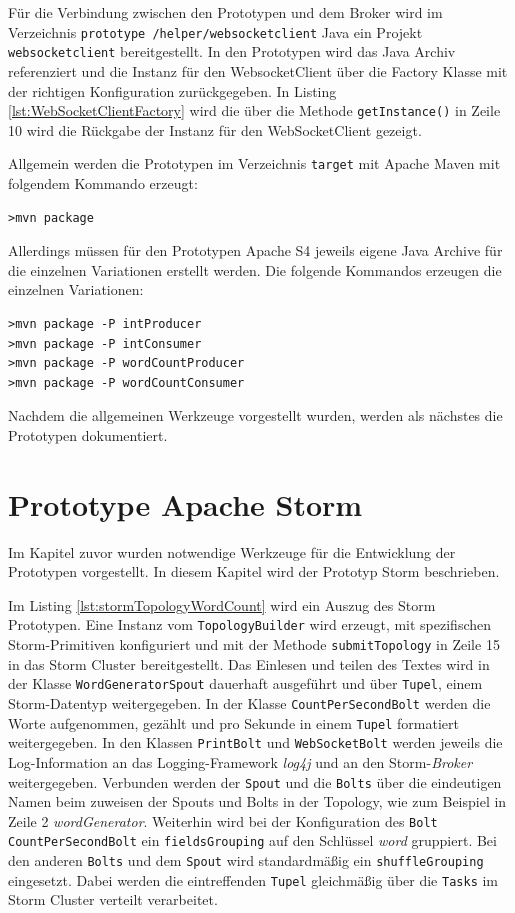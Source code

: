 Für die Verbindung zwischen den Prototypen und dem Broker wird im Verzeichnis \texttt{prototype /helper/websocketclient} Java ein Projekt \texttt{websocketclient} bereitgestellt. In den Prototypen wird das Java Archiv referenziert und 
die Instanz für den WebsocketClient über die Factory Klasse mit der richtigen Konfiguration zurückgegeben. In Listing \ref{lst:WebSocketClientFactory} wird die über die Methode \texttt{getInstance()} in Zeile 10 wird die Rückgabe der Instanz für den WebSocketClient gezeigt.

Allgemein werden die Prototypen im Verzeichnis \texttt{target} mit Apache Maven mit folgendem Kommando erzeugt:
\begin{verbatim}
>mvn package
\end{verbatim}

Allerdings müssen für den Prototypen Apache S4 jeweils eigene Java Archive für die einzelnen Variationen erstellt werden. Die folgende Kommandos erzeugen die einzelnen Variationen:
\begin{verbatim}
>mvn package -P intProducer
>mvn package -P intConsumer
>mvn package -P wordCountProducer
>mvn package -P wordCountConsumer
\end{verbatim}

Nachdem die allgemeinen Werkzeuge vorgestellt wurden, werden als nächstes die Prototypen dokumentiert.


\section{Prototype Apache Storm}
\label{sec:prot:storm}

Im Kapitel zuvor wurden notwendige Werkzeuge für die Entwicklung der Prototypen vorgestellt. In diesem Kapitel wird der Prototyp Storm beschrieben. 

Im Listing \ref{lst:stormTopologyWordCount} wird ein Auszug des Storm Prototypen. Eine Instanz vom \texttt{TopologyBuilder} wird erzeugt, mit spezifischen Storm-Primitiven konfiguriert und mit der Methode \texttt{submitTopology} in Zeile 15 in das Storm Cluster bereitgestellt. Das Einlesen und teilen des Textes wird in der Klasse \texttt{WordGeneratorSpout} dauerhaft ausgeführt und über \texttt{Tupel}, einem Storm-Datentyp weitergegeben. In der Klasse \texttt{CountPerSecondBolt} werden die Worte aufgenommen, gezählt und pro Sekunde in einem \texttt{Tupel} formatiert weitergegeben. In den Klassen \texttt{PrintBolt} und \texttt{WebSocketBolt} werden jeweils die Log-Information an das Logging-Framework \textit{log4j} und an den Storm-\textit{Broker} weitergegeben. Verbunden werden der \texttt{Spout} und die \texttt{Bolts} über die eindeutigen Namen beim zuweisen der Spouts und Bolts in der Topology, wie zum Beispiel in Zeile 2 \textit{wordGenerator}. Weiterhin wird bei der Konfiguration des \texttt{Bolt} \texttt{CountPerSecondBolt} ein \texttt{fieldsGrouping} auf den Schlüssel \textit{word} gruppiert. Bei den anderen \texttt{Bolts} und dem \texttt{Spout} wird standardmäßig ein \texttt{shuffleGrouping} eingesetzt. Dabei werden die eintreffenden \texttt{Tupel} gleichmäßig über die \texttt{Tasks} im Storm Cluster verteilt verarbeitet.

